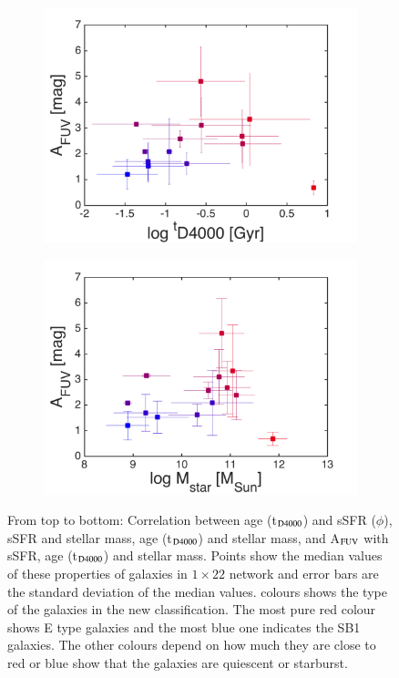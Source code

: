 \begin{figure}
\begin{subfigure}[b]{0.3\textwidth}
            \includegraphics[width=\textwidth]{../image_paper2/1d/f5.png}
        \end{subfigure}
       \hfill
        \begin{subfigure}[b]{0.3\textwidth}
            \includegraphics[width=\textwidth]{../image_paper2/1d/f6.png}
        \end{subfigure}
        \caption[Relations between properties of the clustered galaxies]{From top to bottom: Correlation between age (t$_{\rm {D4000}}$) and sSFR ($\phi$), sSFR and stellar mass, age (t$_{\rm {D4000}}$) and stellar mass, and A$_{\rm {FUV}}$ with sSFR, age (t$_{\rm {D4000}}$) and stellar mass. Points show the median values of these properties of galaxies in $1\times22$ network and error bars are the standard deviation of the median values. colours shows the type of the galaxies in the new classification. The most pure red colour shows E type galaxies and the most blue one indicates the SB1 galaxies. The other colours depend on how much they are close to red or blue show that the galaxies are quiescent or starburst.}
        \label{fig: props_vs_props}
    \end{figure}
        
